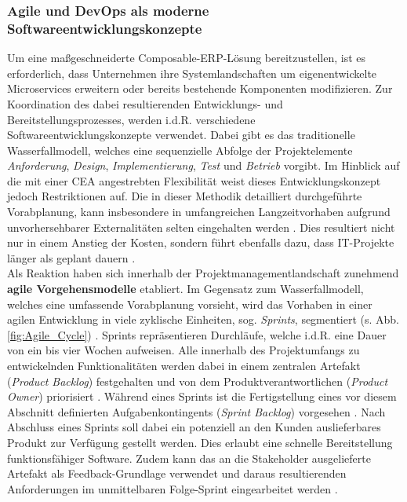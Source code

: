 \subsubsection{Agile und DevOps als moderne Softwareentwicklungskonzepte}
Um eine maßgeschneiderte Composable-ERP-Lösung bereitzustellen, ist es erforderlich, dass Unternehmen ihre Systemlandschaften um eigenentwickelte Microservices erweitern oder bereits bestehende Komponenten modifizieren. Zur Koordination des dabei resultierenden Entwicklungs- und Bereitstellungsprozesses, werden i.d.R. verschiedene Softwareentwicklungskonzepte verwendet. Dabei gibt es das traditionelle Wasserfallmodell, welches eine sequenzielle Abfolge der Projektelemente \textit{Anforderung}, \textit{Design}, \textit{Implementierung}, \textit{Test} und \textit{Betrieb} vorgibt. Im Hinblick auf die mit einer CEA angestrebten Flexibilität weist dieses Entwicklungskonzept jedoch Restriktionen auf. Die in dieser Methodik detailliert durchgeführte Vorabplanung, kann insbesondere in umfangreichen Langzeitvorhaben aufgrund unvorhersehbarer Externalitäten selten eingehalten werden \cite[5]{Vivenzio.2013}. Dies resultiert nicht nur in einem Anstieg der Kosten, sondern führt ebenfalls dazu, dass IT-Projekte länger als geplant dauern \cite[41]{Vieweg.2015}.\\ Als Reaktion haben sich innerhalb der Projektmanagementlandschaft zunehmend \textbf{agile Vorgehensmodelle} etabliert.
Im Gegensatz zum Wasserfallmodell, welches eine umfassende Vorabplanung vorsieht, wird das Vorhaben in einer agilen Entwicklung in viele zyklische Einheiten, sog. \textit{Sprints}, segmentiert (s. Abb. \ref{fig:Agile_Cycle}) \cite[87]{Goll.2015}. Sprints repräsentieren Durchläufe, welche i.d.R. eine Dauer von ein bis vier Wochen aufweisen. Alle innerhalb des Projektumfangs zu entwickelnden Funktionalitäten werden dabei in einem zentralen Artefakt (\textit{Product Backlog}) festgehalten und von dem Produktverantwortlichen (\textit{Product Owner}) priorisiert \cite[196]{Gloger.2010}. Während eines Sprints ist die Fertigstellung eines vor diesem Abschnitt definierten Aufgabenkontingents (\textit{Sprint Backlog}) vorgesehen \cite[194]{.2013}. Nach Abschluss eines Sprints soll dabei ein potenziell an den Kunden auslieferbares Produkt zur Verfügung gestellt werden. Dies erlaubt eine schnelle Bereitstellung funktionsfähiger Software. Zudem kann das an die Stakeholder ausgelieferte Artefakt als Feedback-Grundlage verwendet und daraus resultierenden Anforderungen im unmittelbaren Folge-Sprint eingearbeitet werden \cite[S. 180 ff.]{Gloger.2016b}.
